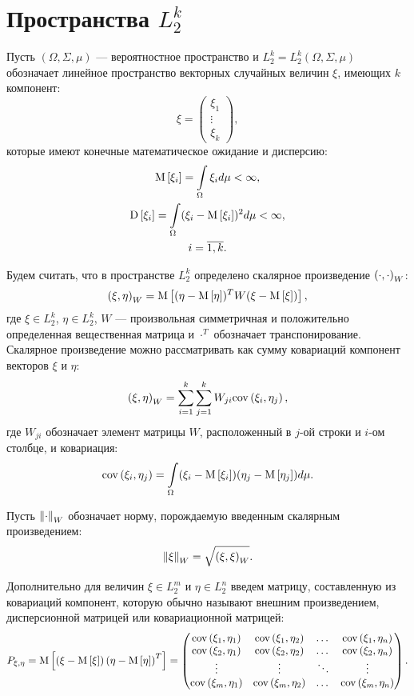 \section{Пространства $L_2^k$}

Пусть $(\Omega, \Sigma, \mu)$ --- вероятностное пространство и $L_2^k = L_2^k (\Omega, \Sigma, \mu)$ обозначает линейное пространство векторных случайных величин $\xi$,
имеющих $k$ компонент:
$$
	\xi
	=
	\begin{pmatrix}
		\xi_1 \\
		\vdots \\
		\xi_k
	\end{pmatrix}
	,
$$
которые имеют конечные математическое ожидание и дисперсию:
\begin{gather*}
	\mathrm{M} \left [ \xi_i \right ] = \int\limits_\Omega \xi_i d \mu < \infty , \\
	\mathrm{D} \left [ \xi_i \right ] = \int\limits_\Omega ( \xi_i - \mathrm{M} \left [ \xi_i \right ] )^2 d \mu < \infty , \\
	i = \overline{1,k}.
\end{gather*}

Будем считать, что в пространстве $L_2^k$ определено скалярное произведение $\left ( \cdot , \cdot \right )_{W}$:
$$
	\left ( \xi , \eta \right )_{W} = \mathrm{M} \left [  ( \eta - \mathrm{M} \left [ \eta \right ] )^T W ( \xi - \mathrm{M} \left [ \xi \right ] )  \right ],
$$
где	$\xi \in L_2^k$, $\eta \in L_2^k$, $W$ --- произвольная симметричная и положительно определенная вещественная матрица и $\cdot^T$ обозначает транспонирование. Скалярное
произведение можно рассматривать как сумму ковариаций компонент векторов $\xi$ и $\eta$:
$$
	\left ( \xi , \eta \right )_{W} = \sum_{i=1}^k \sum_{j=1}^k W_{ji} \mathrm{cov} \left ( \xi_i, \eta_j \right ) ,
$$
где $W_{ji}$ обозначает элемент матрицы $W$, расположенный в $j$-ой строки и $i$-ом столбце, и ковариация:
$$
	\mathrm{cov} \left ( \xi_i, \eta_j \right ) = \int\limits_\Omega ( \xi_i - \mathrm{M} \left [ \xi_i \right ] ) ( \eta_j - \mathrm{M} \left [ \eta_j \right ] ) d\mu .
$$

Пусть $\left \| \cdot \right \|_{W}$ обозначает норму, порождаемую введенным скалярным произведением:
$$
	\left \| \xi \right \|_{W} = \sqrt{\left ( \xi , \xi \right )_{W}} .
$$

Дополнительно для величин $\xi \in L_2^m$ и $\eta \in L_2^n$ введем матрицу, составленную из ковариаций компонент, которую обычно называют внешним произведением, дисперсионной
матрицей или ковариационной матрицей:
$$
	P_{\xi, \eta}
	=
	\mathrm{M} \left [ \left ( \xi - \mathrm{M} \left [ \xi \right ] \right ) \left ( \eta - \mathrm{M} \left [ \eta \right ] \right )^T \right ]
	=
	\begin{pmatrix}
		\mathrm{cov} \left ( \xi_1, \eta_1 \right ) & \mathrm{cov} \left ( \xi_1, \eta_2 \right ) & \dots  & \mathrm{cov} \left ( \xi_1, \eta_n \right ) \\
		\mathrm{cov} \left ( \xi_2, \eta_1 \right ) & \mathrm{cov} \left ( \xi_2, \eta_2 \right ) & \dots  & \mathrm{cov} \left ( \xi_2, \eta_n \right ) \\
		\vdots                     & \vdots                     & \ddots & \vdots \\
		\mathrm{cov} \left ( \xi_m, \eta_1 \right ) & \mathrm{cov} \left ( \xi_m, \eta_2 \right ) & \dots  & \mathrm{cov} \left ( \xi_m, \eta_n \right )
	\end{pmatrix}
	.
$$

